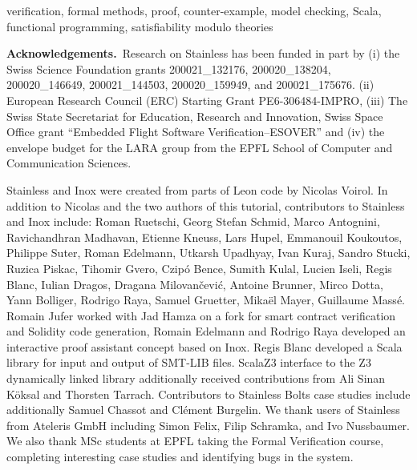 \documentclass{fmcad}
\begin{document}
\begin{IEEEkeywords}
  verification, formal methods, proof, counter-example, model checking,
  Scala, functional programming, satisfiability modulo theories
\end{IEEEkeywords}









  
   \bigskip
   \noindent 
  {\textbf{Acknowledgements.}}\ 
   Research on Stainless has been funded in part
   by (i) the Swiss Science Foundation grants 200021\_132176, 200020\_138204, 200020\_146649, 200021\_144503, 200020\_159949,
   and 200021\_175676.   
   (ii) European Research Council (ERC) Starting Grant PE6-306484-IMPRO, 
   (iii) The Swiss State Secretariat for Education,
   Research and Innovation, Swiss Space Office grant ``Embedded Flight Software Verification--ESOVER'' and
   (iv) the envelope budget for the LARA group from the EPFL School of Computer and Communication Sciences.

   Stainless and Inox were created from parts of Leon code by Nicolas Voirol.
   In addition to Nicolas and the two authors of this tutorial, contributors to Stainless and Inox include:
   Roman Ruetschi, Georg Stefan Schmid, Marco Antognini, Ravichandhran Madhavan, Etienne Kneuss,    
   Lars Hupel, Emmanouil Koukoutos, Philippe Suter, Roman Edelmann, Utkarsh Upadhyay, Ivan Kuraj, Sandro Stucki,
   Ruzica Piskac, Tihomir Gvero,  Czipó Bence, Sumith Kulal, Lucien Iseli,   
   Regis Blanc, Iulian Dragos, Dragana Milovan\v{c}evi\'c, Antoine Brunner, Mirco Dotta,   
   Yann Bolliger, Rodrigo Raya, Samuel Gruetter, Mika\"el Mayer, Guillaume Massé.
   Romain Jufer worked with Jad Hamza on a fork for smart contract verification and Solidity code generation,
   Romain Edelmann and Rodrigo Raya developed an interactive proof assistant concept based on Inox.
   Regis Blanc developed a Scala library for
   input and output of SMT-LIB files. ScalaZ3 interface to the Z3 dynamically
   linked library additionally received contributions from Ali Sinan K\"oksal
   and Thorsten Tarrach.
   Contributors to Stainless Bolts case studies include additionally Samuel Chassot and Cl\'ement Burgelin. We thank
   users of Stainless from Ateleris GmbH including Simon Felix, Filip Schramka, and Ivo Nussbaumer. We also thank
   MSc students at EPFL taking the Formal Verification course, completing interesting case studies and identifying bugs in the system.


\end{document}
